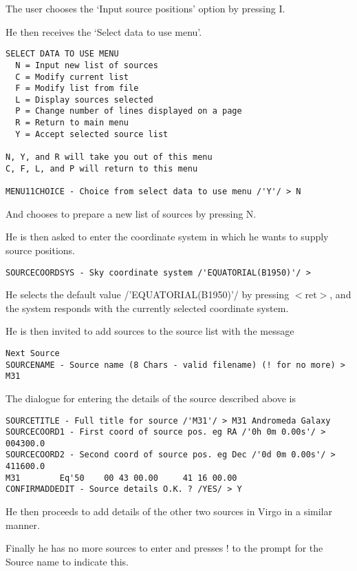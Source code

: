 The user chooses the `Input source positions' option by pressing I.

He then receives the `Select data to use menu'.

\begin{verbatim}
SELECT DATA TO USE MENU
  N = Input new list of sources
  C = Modify current list
  F = Modify list from file
  L = Display sources selected
  P = Change number of lines displayed on a page
  R = Return to main menu
  Y = Accept selected source list

N, Y, and R will take you out of this menu
C, F, L, and P will return to this menu

MENU11CHOICE - Choice from select data to use menu /'Y'/ > N
\end{verbatim}

And chooses to prepare a new list of sources by pressing N.

He is then asked to enter the coordinate system in which he wants to supply
source positions.

\begin{verbatim}
SOURCECOORDSYS - Sky coordinate system /'EQUATORIAL(B1950)'/ >              
\end{verbatim}

He selects the default value /'EQUATORIAL(B1950)'/ by pressing $<$ret$>$,
and the system responds with the currently selected coordinate system.

He is then invited to add sources to the source list with the message

\begin{verbatim}
Next Source
SOURCENAME - Source name (8 Chars - valid filename) (! for no more) > M31
\end{verbatim}

The dialogue for entering the details of the source described above is

\begin{verbatim}
SOURCETITLE - Full title for source /'M31'/ > M31 Andromeda Galaxy
SOURCECOORD1 - First coord of source pos. eg RA /'0h 0m 0.00s'/ > 004300.0
SOURCECOORD2 - Second coord of source pos. eg Dec /'0d 0m 0.00s'/ > 411600.0
M31        Eq'50    00 43 00.00     41 16 00.00
CONFIRMADDEDIT - Source details O.K. ? /YES/ > Y
\end{verbatim}

He then proceeds to add details of the other two sources in Virgo in a similar
manner.

Finally he has no more sources to enter and presses ! to the prompt for the
Source name to indicate this.

